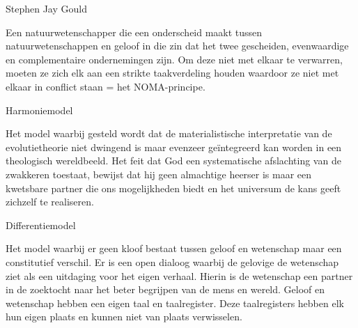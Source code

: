 \documentclass[main.tex]{subfiles}
\begin{document}
\begin{examenvraag}
    \begin{vraag}
        Stephen Jay Gould
    \end{vraag}

    \begin{antwoord}
        Een natuurwetenschapper die een onderscheid maakt tussen natuurwetenschappen en geloof in die 
        zin dat het twee gescheiden,‭ ‬evenwaardige en complementaire ondernemingen zijn.‭ ‬Om deze niet 
        met elkaar te verwarren,‭ ‬moeten ze zich elk aan een strikte taakverdeling houden waardoor ze 
        niet met elkaar in conflict staan‭ = ‬het NOMA-principe.
    \end{antwoord}
\end{examenvraag}


\begin{examenvraag}
    \begin{vraag}
        Harmoniemodel
    \end{vraag}

    \begin{antwoord}
        Het model waarbij‭ ‬gesteld wordt dat de materialistische interpretatie van de evolutietheorie 
        niet dwingend is maar evenzeer geïntegreerd kan worden in een theologisch‭ ‬wereldbeeld.‭ ‬Het feit 
        dat God een systematische afslachting van de zwakkeren toestaat,‭ ‬bewijst dat hij geen 
        almachtige heerser is maar een kwetsbare partner die ons mogelijkheden biedt en het universum 
        de kans geeft zichzelf te realiseren.
    \end{antwoord}
\end{examenvraag}


\begin{examenvraag}
    \begin{vraag}
        Differentiemodel
    \end{vraag}

    \begin{antwoord}
        Het model waarbij er geen kloof bestaat tussen geloof en wetenschap maar een constitutief 
        verschil.‭ ‬Er is een open dialoog waarbij de gelovige de wetenschap ziet als een uitdaging voor 
        het eigen verhaal.‭ ‬Hierin is de wetenschap een partner in de zoektocht naar het beter begrijpen 
        van de mens en wereld.‭ ‬Geloof en wetenschap hebben een eigen taal en taalregister.‭ ‬Deze 
        taalregisters hebben elk hun eigen plaats en kunnen niet van plaats verwisselen.‭ 
    \end{antwoord}
\end{examenvraag}

\end{document}
